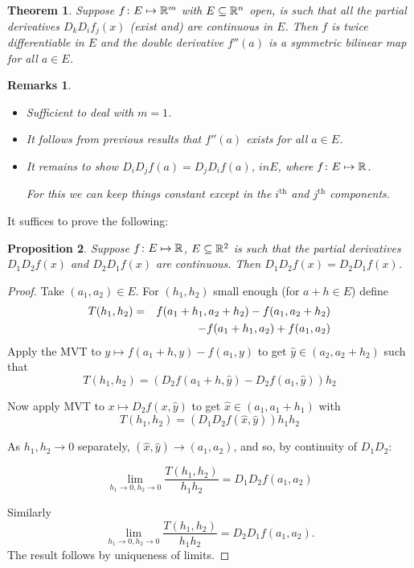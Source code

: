 \documentclass{notes}
\theoremstyle{plain}
\newtheorem{proposition}{Proposition}[chapter]
\newtheorem{theorem}[proposition]{Theorem}
\newtheorem*{remarks}{Remarks}
\begin{document}
\begin{theorem}
Suppose $ f\colon E \mapsto \mathbb{R}^{m} $ with $ E \subseteq \mathbb{R}^{n} $ 
open, is such that all the partial derivatives $ D_{k}D_{i}f_{j}(x) 
$ (exist and) are continuous in $ E $. Then $ f $ is twice 
differentiable in $ E $ and the double derivative $ f''(a) $ is a 
symmetric bilinear map for all $ a\in E $.
\end{theorem}
\begin{remarks}
\

\begin{itemize}
\item Sufficient to deal with $ m=1 $.
\item It follows from previous results that $ f''(a)$ exists for 
all $ a \in E$.
\item It remains to show $ D_{i}D_{j}f(a)=D_{j}D_{i}f(a) $, $ in E 
$, where $ f\colon E \mapsto \mathbb{R} $.

For this we can keep things constant except in the $i^{\text{th}}$ and
$ j^{\text{th}}$ components.
\end{itemize}
\end{remarks}

It suffices to prove the following:

\begin{proposition}
Suppose $ f\colon E \mapsto \mathbb{R} $, $ E \subseteq \mathbb{R}^{2} $ is such 
that the partial derivatives $ D_{1}D_{2}f(x) $ and $ D_{2}D_{1}f(x) 
$ are continuous.
Then $ D_{1}D_{2}f(x)=D_{2}D_{1}f(x) $.
\end{proposition}

\begin{proof}
Take $ (a_{1},a_{2}) \in E $. For $ (h_{1},h_{2}) $ small enough 
(for $ a+h \in E $) define
\begin{eqnarray*}
T(h_{1},h_{2}) & = & f(a_{1}+h_{1},a_{2}+h_{2})-f(a_{1},a_{2}+h_{2}) 
\cr
               &   & - f(a_{1}+h_{1},a_{2}) + f(a_{1},a_{2})
\end{eqnarray*}
Apply the MVT to $ y \mapsto f(a_{1}+h,y)-f(a_{1},y) $ to get $ 
\hat{y} \in (a_{2},a_{2}+h_{2}) $ such that 
\[ T(h_{1},h_{2}) = (D_{2}f(a_{1}+h, \hat{y})-D_{2}f(a_{1},\hat{y}))h_{2}\]

Now apply MVT to $ x \mapsto D_{2}f(x,\hat{y}) $ to get $ \hat{x} 
\in (a_{1},a_{1}+h_{1}) $ with
\[ T(h_{1},h_{2})=(D_{1}D_{2}f(\hat{x},\hat{y}))h_{1}h_{2} \]

As $ h_{1},h_{2}\to 0 $ separately, $ (\hat{x}, \hat{y}) 
\to (a_{1},a_{2}) $, and so, by continuity of $ D_{1}D_{2} $:

\[ \lim_{h_{1}\to 0, h_{2} \to 
0}\frac{T(h_{1},h_{2})}{h_{1}h_{2}} = D_{1}D_{2}f(a_{1},a_{2}) \]

Similarly
\[ \lim_{h_{1}\to 0, h_{2} \to 
0}\frac{T(h_{1},h_{2})}{h_{1}h_{2}} = D_{2}D_{1}f(a_{1},a_{2}).
\]
The result follows by uniqueness of limits.
\end{proof}
\end{document}
